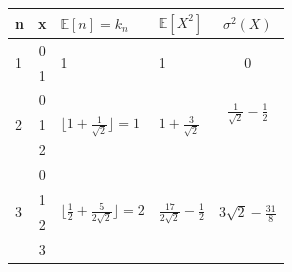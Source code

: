 \documentclass[longpaper, english, final, times]{revdetua}
\begin{document}
%				
%				
		{\def\arraystretch{1.4}%
			\begin{center}
				\begin{tabular}{l|c|l|l|c} 
					\hline
					n & x &$\mathbb{E}[n]=k_n$&$\mathbb{E}[X^2]$&$\sigma^2(X)$\\
					\hline
					\multirow{2}{0.5cm}{1}&0 &\multirow{2}{1cm}{1}&\multirow{2}{2cm}{1}&\multirow{2}{1.5cm}{0}\\
					&1&&&\\
					\hline
					
					\multirow{3}{0.5cm}{2}&0 &\multirow{3}{2cm}{$\lfloor 1+\frac{1}{\sqrt{2}}\rfloor =1$}&\multirow{3}{2cm}{$1+\frac{3}{\sqrt{2}}$}&\multirow{2}{1.5cm}{$\frac{1}{\sqrt{2}}-\frac{1}{2}$}\\
					&1&&&\\
					&2&&&\\
					\hline
					
					\multirow{4}{0.5cm}{3} &0 &\multirow{4}{2.1cm}{$\lfloor \frac{1}{2}+\frac{5}{2\sqrt{2}}\rfloor =2$}
					&\multirow{4}{2cm}{$\frac{17}{2\sqrt{2}}-\frac{1}{2}$}
					&\multirow{4}{1.5cm}{$3\sqrt{2}-\frac{31}{8}$}\\
					&1&&&\\
					&2&&&\\
					&3&&&\\
					\hline
				\end{tabular}
			\end{center}
		}
	
\end{document}
